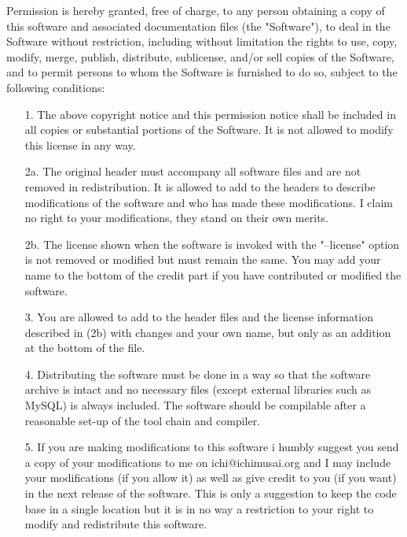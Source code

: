 \documentclass[english,twoside,openright,a4paper,12pt]{article}
\begin{document}
Permission is hereby granted, free of charge, to any person obtaining
a copy of this software and associated documentation files (the
"Software"), to deal in the Software without restriction, including
without limitation the rights to use, copy, modify, merge, publish,
distribute, sublicense, and/or sell copies of the Software, and to
permit persons to whom the Software is furnished to do so, subject to
the following conditions:

\begin{itemize}
\item[1.] The above copyright notice and this permission notice shall
  be included in all copies or substantial portions of the Software.
  It is not allowed to modify this license in any way.
  
\item[2a.] The original header must accompany all software files and
  are not removed in redistribution. It is allowed to add to the
  headers to describe modifications of the software and who has made
  these modifications. I claim no right to your modifications, they
  stand on their own merits.
 
\item[2b.] The license shown when the software is invoked with the
  "--license" option is not removed or modified but must remain the
  same. You may add your name to the bottom of the credit part if you
  have contributed or modified the software.
 
\item[3.] You are allowed to add to the header files and the license
  information described in (2b) with changes and your own name, but
  only as an addition at the bottom of the file.
 
\item[4.] Distributing the software must be done in a way so that the
  software archive is intact and no necessary files (except external
  libraries such as MySQL) is always included. The software should be
  compilable after a reasonable set-up of the tool chain and compiler.
 
\item[5.] If you are making modifications to this software i humbly
  suggest you send a copy of your modifications to me on
  ichi@ichimusai.org and I may include your modifications (if you
  allow it) as well as give credit to you (if you want) in the next
  release of the software. This is only a suggestion to keep the code
  base in a single location but it is in no way a restriction to your
  right to modify and redistribute this software.
\end{itemize}
\end{document}
